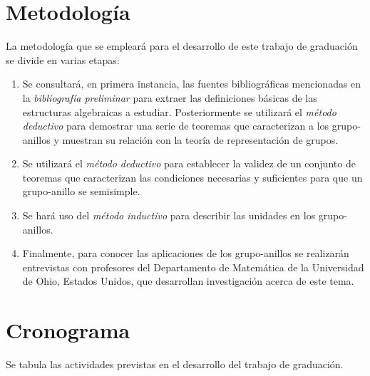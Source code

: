 \documentclass[12pt,letterpaper,titlepage]{article}
\begin{document}
\newpage

\section{Metodología}

La metodología que se empleará para el desarrollo de este trabajo de graduación se divide en varias etapas:

\begin{enumerate}
\item Se consultará, en primera instancia, las fuentes bibliográficas mencionadas en la \textit{bibliografía preliminar} para extraer las definiciones básicas de las estructuras algebraicas a estudiar. Posteriormente se utilizará el \textit{método deductivo} para demostrar una serie de teoremas que caracterizan a los grupo-anillos y muestran su relación con la teoría de representación de grupos.


\item Se utilizará el \textit{método deductivo} para establecer la validez de un conjunto de teoremas que caracterizan las condiciones necesarias y suficientes para que un grupo-anillo se semisimple.

\item Se hará uso del\textit{ método inductivo} para describir las unidades en los grupo-anillos.


\item Finalmente, para conocer las aplicaciones de los grupo-anillos se realizarán entrevistas con profesores del Departamento de Matemática de la Universidad de Ohio, Estados Unidos, que desarrollan investigación acerca de este tema.
 
\end{enumerate}



\newpage





\section{Cronograma}
Se tabula las actividades previstas en el desarrollo del trabajo de graduación.
\end{document}
